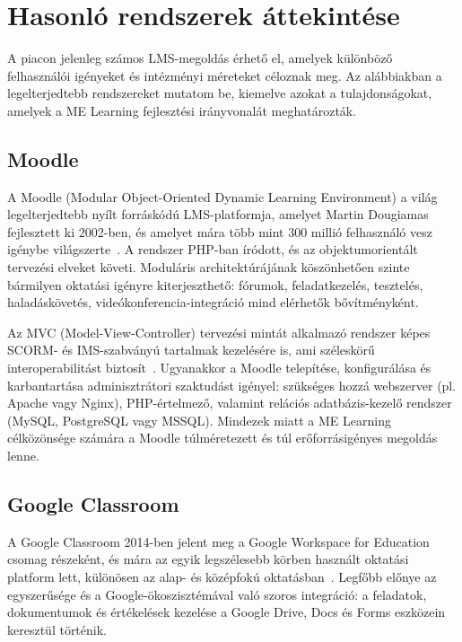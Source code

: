 \section{Hasonló rendszerek áttekintése}

A piacon jelenleg számos LMS-megoldás érhető el, amelyek különböző felhasználói igényeket és intézményi méreteket céloznak meg. Az alábbiakban a legelterjedtebb rendszereket mutatom be, kiemelve azokat a tulajdonságokat, amelyek a ME Learning fejlesztési irányvonalát meghatározták.

\subsection{Moodle}

A Moodle (Modular Object-Oriented Dynamic Learning Environment) a világ legelterjedtebb nyílt forráskódú LMS-platformja, amelyet Martin Dougiamas fejlesztett ki 2002-ben, és amelyet mára több mint 300 millió felhasználó vesz igénybe világszerte~\cite{moodle2024stats}. A rendszer PHP-ban íródott, és az objektumorientált tervezési elveket követi. Moduláris architektúrájának köszönhetően szinte bármilyen oktatási igényre kiterjeszthető: fórumok, feladatkezelés, tesztelés, haladáskövetés, videókonferencia-integráció mind elérhetők bővítményként.

Az MVC (Model-View-Controller) tervezési mintát alkalmazó rendszer képes SCORM- és IMS-szabványú tartalmak kezelésére is, ami széleskörű interoperabilitást biztosít~\cite{cole2007moodle}. Ugyanakkor a Moodle telepítése, konfigurálása és karbantartása adminisztrátori szaktudást igényel: szükséges hozzá webszerver (pl. Apache vagy Nginx), PHP-értelmező, valamint relációs adatbázis-kezelő rendszer (MySQL, PostgreSQL vagy MSSQL). Mindezek miatt a ME Learning célközönsége számára a Moodle túlméretezett és túl erőforrásigényes megoldás lenne.

\subsection{Google Classroom}

A Google Classroom 2014-ben jelent meg a Google Workspace for Education csomag részeként, és mára az egyik legszélesebb körben használt oktatási platform lett, különösen az alap- és középfokú oktatásban~\cite{google2023classroom}. Legfőbb előnye az egyszerűsége és a Google-ökoszisztémával való szoros integráció: a feladatok, dokumentumok és értékelések kezelése a Google Drive, Docs és Forms eszközein keresztül történik.

